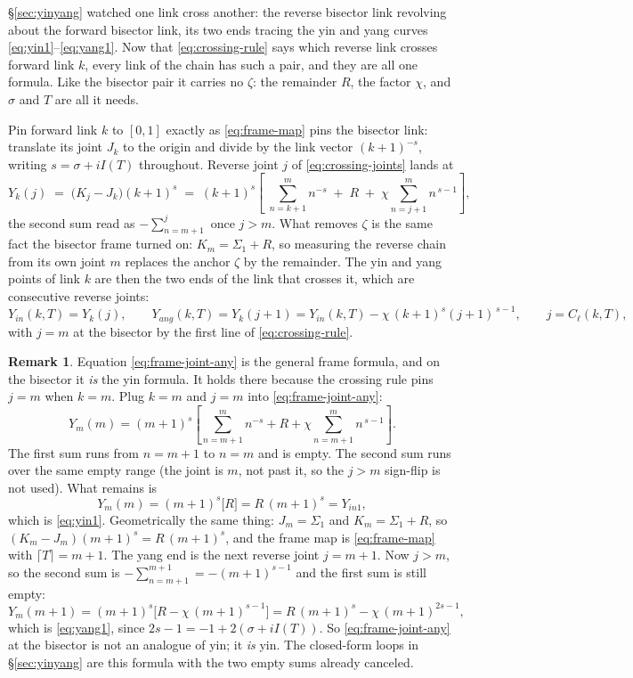 \documentclass[11pt]{article}
\theoremstyle{definition}
\newtheorem{remark}[theorem]{Remark}
\begin{document}
\S\ref{sec:yinyang} watched one link cross another: the reverse bisector link
revolving about the forward bisector link, its two ends tracing the yin and
yang curves \eqref{eq:yin1}--\eqref{eq:yang1}. Now that \eqref{eq:crossing-rule}
says which reverse link crosses forward link $k$, every link of the chain has
such a pair, and they are all one formula. Like the bisector pair it carries no
$\zeta$: the remainder $R$, the factor $\chi$, and $\sigma$ and $T$ are all it
needs.

Pin forward link $k$ to $[0,1]$ exactly as \eqref{eq:frame-map} pins the
bisector link: translate its joint $J_k$ to the origin and divide by the link
vector $(k+1)^{-s}$, writing $s=\sigma+iI(T)$ throughout. Reverse joint $j$ of
\eqref{eq:crossing-joints} lands at
\begin{equation}\label{eq:frame-joint-any}
Y_k(j)\;=\;\bigl(K_j-J_k\bigr)(k+1)^{s}
\;=\;(k+1)^{s}\left[\;\sum_{n=k+1}^{m}n^{-s}\;+\;R\;+\;\chi\!\!\sum_{n=j+1}^{m}\!\!n^{\,s-1}\right],
\end{equation}
the second sum read as $-\sum_{n=m+1}^{j}$ once $j>m$. What removes $\zeta$ is
the same fact the bisector frame turned on: $K_m=\Sigma_1+R$, so measuring the
reverse chain from its own joint $m$ replaces the anchor $\zeta$ by the
remainder. The yin and yang points of link $k$ are then the two ends of the
link that crosses it, which are consecutive reverse joints:
\begin{equation}\label{eq:yin-any}
Y_{in}(k,T)=Y_k(j),
\qquad
Y_{ang}(k,T)=Y_k(j+1)=Y_{in}(k,T)-\chi\,(k+1)^{s}(j+1)^{\,s-1},
\qquad j=C_{\ell}(k,T),
\end{equation}
with $j=m$ at the bisector by the first line of \eqref{eq:crossing-rule}.

\begin{remark}
Equation \eqref{eq:frame-joint-any} is the general frame formula, and on the
bisector it \emph{is} the yin formula. It holds there because the crossing
rule pins $j=m$ when $k=m$. Plug $k=m$ and $j=m$ into
\eqref{eq:frame-joint-any}:
\[
Y_m(m)=(m+1)^{s}\left[\sum_{n=m+1}^{m}n^{-s}+R+\chi\sum_{n=m+1}^{m}n^{\,s-1}\right].
\]
The first sum runs from $n=m+1$ to $n=m$ and is empty. The second sum runs
over the same empty range (the joint is $m$, not past it, so the $j>m$
sign-flip is not used). What remains is
\[
Y_m(m)=(m+1)^{s}\bigl[R\bigr]=R\,(m+1)^{s}=Y_{in1},
\]
which is \eqref{eq:yin1}. Geometrically the same thing: $J_m=\Sigma_1$ and
$K_m=\Sigma_1+R$, so
$(K_m-J_m)(m+1)^{s}=R\,(m+1)^{s}$, and the frame map is
\eqref{eq:frame-map} with $\lceil T\rceil=m+1$. The yang end is the next
reverse joint $j=m+1$. Now $j>m$, so the second sum is
$-\sum_{n=m+1}^{m+1}=-(m+1)^{s-1}$ and the first sum is still empty:
\[
Y_m(m+1)=(m+1)^{s}\bigl[R-\chi\,(m+1)^{s-1}\bigr]
=R\,(m+1)^{s}-\chi\,(m+1)^{2s-1},
\]
which is \eqref{eq:yang1}, since $2s-1=-1+2(\sigma+iI(T))$. So
\eqref{eq:frame-joint-any} at the bisector is not an analogue of yin; it
\emph{is} yin. The closed-form loops in \S\ref{sec:yinyang} are this formula
with the two empty sums already canceled.
\end{remark}
\end{document}
